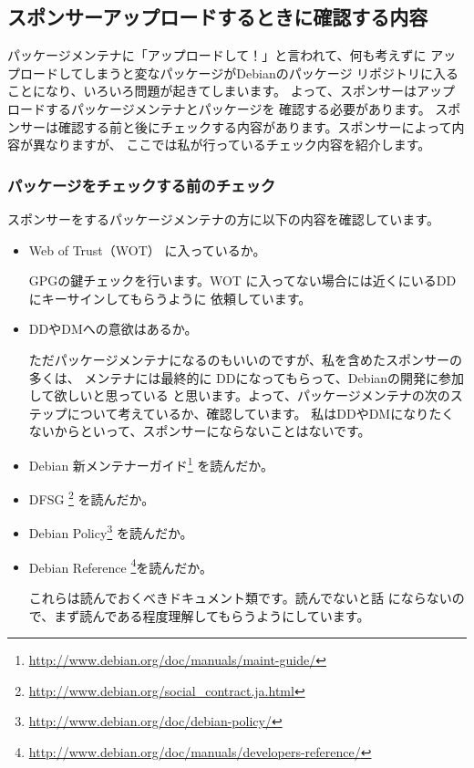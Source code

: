 \documentclass[mingoth,a4paper]{jsarticle}
\begin{document}
\subsection{スポンサーアップロードするときに確認する内容}

パッケージメンテナに「アップロードして！」と言われて、何も考えずに
アップロードしてしまうと変なパッケージがDebianのパッケージ
リポジトリに入ることになり、いろいろ問題が起きてしまいます。
よって、スポンサーはアップロードするパッケージメンテナとパッケージを
確認する必要があります。
スポンサーは確認する前と後にチェックする内容があります。スポンサーによって内容が異なりますが、
ここでは私が行っているチェック内容を紹介します。

\subsubsection{パッケージをチェックする前のチェック}

スポンサーをするパッケージメンテナの方に以下の内容を確認しています。

\begin{itemize}
\item Web of Trust（WOT） に入っているか。

GPGの鍵チェックを行います。WOT に入ってない場合には近くにいるDDにキーサインしてもらうように
依頼しています。

\item DDやDMへの意欲はあるか。

ただパッケージメンテナになるのもいいのですが、私を含めたスポンサーの多くは、
メンテナには最終的に DDになってもらって、Debianの開発に参加して欲しいと思っている
と思います。よって、パッケージメンテナの次のステップについて考えているか、確認しています。
私はDDやDMになりたくないからといって、スポンサーにならないことはないです。

\item Debian 新メンテナーガイド\footnote{\url{http://www.debian.org/doc/manuals/maint-guide/}} を読んだか。
\item DFSG \footnote{\url{http://www.debian.org/social_contract.ja.html}} を読んだか。
\item Debian Policy\footnote{\url{http://www.debian.org/doc/debian-policy/}} を読んだか。
\item Debian Reference \footnote{\url{http://www.debian.org/doc/manuals/developers-reference/}}を読んだか。

これらは読んでおくべきドキュメント類です。読んでないと話
にならないので、まず読んである程度理解してもらうようにしています。

\end{itemize}
\end{document}

